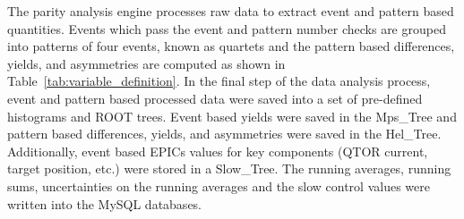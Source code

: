 The parity analysis engine processes raw data to extract event and pattern based quantities. Events which pass the event and pattern number checks are grouped into patterns of four events, known as quartets and the pattern based differences, yields, and asymmetries are computed as shown in Table~\ref{tab:variable_definition}. 
In the final step of the data analysis process, event and pattern based processed data were saved into a set of pre-defined histograms and ROOT trees. Event based yields were saved in the Mps\_Tree and pattern based differences, yields, and asymmetries were saved in the Hel\_Tree. Additionally, event based EPICs values for key components (QTOR current, target position, etc.) were stored in a Slow\_Tree. The running averages, running sums, uncertainties on the running averages and the slow control values were written into the MySQL databases.


